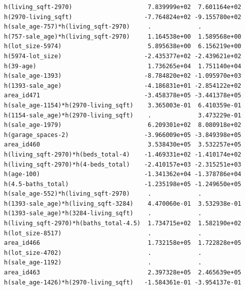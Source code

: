 \documentclass[
]{article}
\begin{document}
\begin{verbatim}
h(living_sqft-2970)                     7.839999e+02  7.601164e+02
h(2970-living_sqft)                    -7.764824e+02 -9.155780e+02
h(sale_age-757)*h(living_sqft-2970)     .             .           
h(757-sale_age)*h(living_sqft-2970)     1.164538e+00  1.589568e+00
h(lot_size-5974)                        5.895638e+00  6.156219e+00
h(5974-lot_size)                       -2.435377e+02 -2.439621e+02
h(39-age)                               1.736265e+04  1.751140e+04
h(sale_age-1393)                       -8.784820e+02 -1.095970e+03
h(1393-sale_age)                       -4.186831e+01 -2.854122e+02
area_id471                             -3.458378e+05 -3.441378e+05
h(sale_age-1154)*h(2970-living_sqft)    3.365003e-01  6.410359e-01
h(1154-sale_age)*h(2970-living_sqft)    .             3.473229e-01
h(sale_age-1979)                        6.209301e+02  8.080918e+02
h(garage_spaces-2)                     -3.966009e+05 -3.849398e+05
area_id460                              3.538430e+05  3.532257e+05
h(living_sqft-2970)*h(beds_total-4)    -1.469331e+02 -1.410174e+02
h(living_sqft-2970)*h(4-beds_total)    -2.410157e+03 -2.315251e+03
h(age-100)                             -1.341362e+04 -1.378786e+04
h(4.5-baths_total)                     -1.235198e+05 -1.249650e+05
h(sale_age-552)*h(living_sqft-2970)     .             .           
h(1393-sale_age)*h(living_sqft-3284)    4.470060e-01  3.532938e-01
h(1393-sale_age)*h(3284-living_sqft)    .             .           
h(living_sqft-2970)*h(baths_total-4.5)  1.734715e+02  1.582190e+02
h(lot_size-8517)                        .             .           
area_id466                              1.732158e+05  1.722828e+05
h(lot_size-4702)                        .             .           
h(sale_age-1192)                        .             .           
area_id463                              2.397328e+05  2.465639e+05
h(sale_age-1426)*h(2970-living_sqft)   -1.584361e-01 -3.954137e-01
                                                                  

\end{verbatim}
\end{document}
